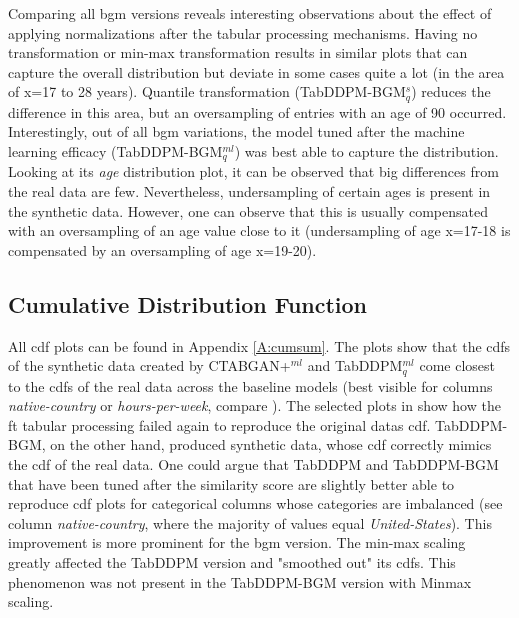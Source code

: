 Comparing all \gls{bgm} versions reveals interesting observations about the effect of applying normalizations after the tabular processing mechanisms.
Having no transformation or min-max transformation results in similar plots that can capture the overall distribution but deviate in some cases quite a lot (in the area of x=17 to 28 years).
Quantile transformation (TabDDPM-BGM$^{s}_q$) reduces the difference in this area, but an oversampling of entries with an age of 90 occurred.
Interestingly, out of all \gls{bgm} variations, the model tuned after the machine learning efficacy (TabDDPM-BGM$^{ml}_q$) was best able to capture the distribution.
Looking at its \textit{age} distribution plot, it can be observed that big differences from the real data are few.
Nevertheless, undersampling of certain ages is present in the synthetic data.
However, one can observe that this is usually compensated with an oversampling of an age value close to it
(\eg undersampling of age x=17-18 is compensated by an oversampling of age x=19-20).

\subsection{Cumulative Distribution Function}
All \gls{cdf} plots can be found in Appendix \ref{A:cumsum}.
The plots show that the \glspl{cdf} of the synthetic data created by CTABGAN+$^{ml}$ and TabDDPM$^{ml}_q$ come closest to
the \glspl{cdf} of the real data across the baseline models (best visible for columns \textit{native-country} or \textit{hours-per-week}, compare ).
The selected plots in  show how the \gls{ft} tabular processing failed again to reproduce the original datas \gls{cdf}.
TabDDPM-BGM, on the other hand, produced synthetic data, whose \gls{cdf} correctly mimics the \gls{cdf} of the real data.
One could argue that TabDDPM and TabDDPM-BGM that have been tuned after the similarity score are slightly better able to
reproduce \gls{cdf} plots for categorical columns whose categories are imbalanced (\eg see column \textit{native-country}, where the majority of values equal \textit{United-States}).
This improvement is more prominent for the \gls{bgm} version.
The min-max scaling greatly affected the TabDDPM version and "smoothed out" its \glspl{cdf}.
This phenomenon was not present in the TabDDPM-BGM version with Minmax scaling.

